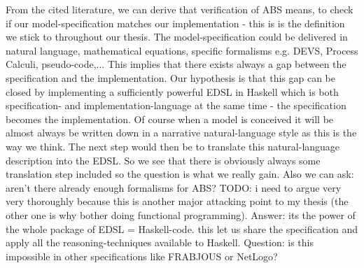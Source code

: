 From the cited literature, we can derive that verification of ABS means, to check if our model-specification matches our implementation - this is is the definition we stick to throughout our thesis. The model-specification could be delivered in natural language, mathematical equations, specific formalisms e.g. DEVS, Process Calculi, pseudo-code,... This implies that there exists always a gap between the specification and the implementation. Our hypothesis is that this gap can be closed by implementing a sufficiently powerful EDSL in Haskell which is both specification- and implementation-language at the same time - the specification becomes the implementation. Of course when a model is conceived it will be almost always be written down in a narrative natural-language style as this is the way we think. The next step would then be to translate this natural-language description into the EDSL. So we see that there is obviously always some translation step included so the question is what we really gain. Also we can ask: aren't there already enough formalisms for ABS? TODO: i need to argue very very thoroughly because this is another major attacking point to my thesis (the other one is why bother doing functional programming).
Answer: its the power of the whole package of EDSL = Haskell-code. this let us share the specification and apply all the reasoning-techniques available to Haskell. Question: is this impossible in other specifications like FRABJOUS or NetLogo?


